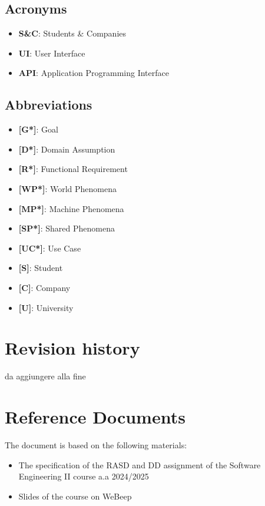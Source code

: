 \subsection{Acronyms}
\label{subsec:acronyms}%

\begin{itemize}
\item
  \textbf{S\&C}: Students \& Companies
\item
  \textbf{UI}: User Interface
\item
  \textbf{API}: Application Programming Interface
\end{itemize}

\subsection{Abbreviations}
\label{subsec:abbreviations}%

\begin{itemize}
\item
  \textbf{{[}G*{]}}: Goal
\item
  \textbf{{[}D*{]}}: Domain Assumption
\item
  \textbf{{[}R*{]}}: Functional Requirement
\item
  \textbf{{[}WP*{]}}: World Phenomena
\item
  \textbf{{[}MP*{]}}: Machine Phenomena
\item
  \textbf{{[}SP*{]}}: Shared Phenomena
\item
  \textbf{{[}UC*{]}}: Use Case
\item
  \textbf{{[}S{]}}: Student
\item
  \textbf{{[}C{]}}: Company
\item
  \textbf{{[}U{]}}: University
\end{itemize}

\section{Revision history}
\label{sec:revision_history}%

da aggiungere alla fine

\section{Reference Documents}
\label{sec:reference_documents}%

The document is based on the following materials:

\begin{itemize}
\item
  The specification of the RASD and DD assignment of the Software
  Engineering II course a.a 2024/2025~
\item
  Slides of the course on WeBeep
\end{itemize}


